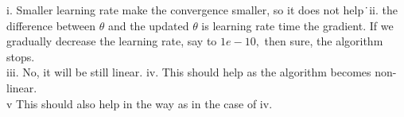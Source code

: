\begin{answer}

i. Smaller learning rate make the convergence smaller, so it does not help\.\
ii. the difference between $\theta$ and the updated $\theta$ is learning rate time the gradient.
If we gradually decrease the learning rate, say to $1e-10,$ then sure, the algorithm stops.\\
iii. No, it will be still linear.
iv. This should help as the algorithm becomes non-linear.\\
v This should also help in the way as in the case of iv.
\end{answer}
